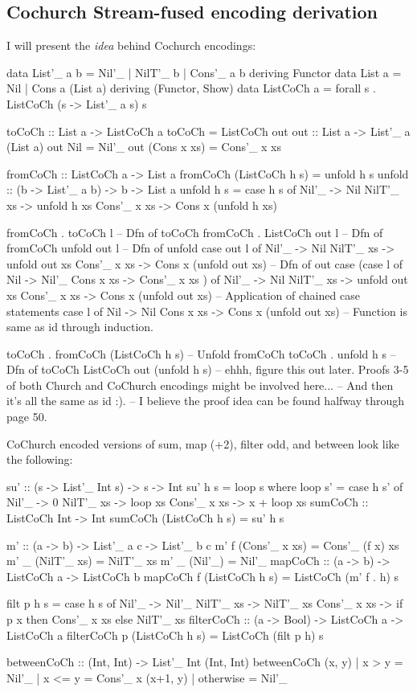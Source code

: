 
\subsection{Cochurch Stream-fused encoding derivation}\label{app:cochurch_stream}
I will present the \textit{idea} behind Cochurch encodings:
\begin{spec}
data List'_ a b = Nil'_ | NilT'_ b | Cons'_ a b deriving Functor
data List a = Nil | Cons a (List a) deriving (Functor, Show)
data ListCoCh a = forall s . ListCoCh (s -> List'_ a s) s

toCoCh :: List a -> ListCoCh a
toCoCh = ListCoCh out
out :: List a -> List'_ a (List a)
out Nil = Nil'_
out (Cons x xs) = Cons'_ x xs

fromCoCh :: ListCoCh a -> List a
fromCoCh (ListCoCh h s) = unfold h s
unfold :: (b -> List'_ a b) -> b -> List a
unfold h s = case h s of
  Nil'_ -> Nil
  NilT'_ xs -> unfold h xs
  Cons'_ x xs -> Cons x (unfold h xs)


fromCoCh . toCoCh l
-- Dfn of toCoCh
fromCoCh . ListCoCh out l
-- Dfn of fromCoCh
unfold out l
-- Dfn of unfold
case out l of
  Nil'_ -> Nil
  NilT'_ xs -> unfold out xs
  Cons'_ x xs -> Cons x (unfold out xs)
-- Dfn of out
case (case l of
  Nil -> Nil'_
  Cons x xs -> Cons'_ x xs
  ) of
  Nil'_ -> Nil
  NilT'_ xs -> unfold out xs
  Cons'_ x xs -> Cons x (unfold out xs)
-- Application of chained case statements
case l of
  Nil -> Nil
  Cons x xs -> Cons x (unfold out xs)
-- Function is same as id through induction.


toCoCh . fromCoCh (ListCoCh h s)
-- Unfold fromCoCh
toCoCh . unfold h s
-- Dfn of toCoCh
ListCoCh out (unfold h s)
-- ehhh, figure this out later. Proofs 3-5 of both Church and CoChurch encodings might be involved here...
-- And then it's all the same as id :).
-- I believe the proof idea can be found halfway through page 50.
\end{spec}
CoChurch encoded versions of sum, map (+2), filter odd, and between look like the following:
\begin{spec}
su' :: (s -> List'_ Int s) -> s -> Int
su' h s = loop s
  where loop s' = case h s' of
    Nil'_ -> 0
    NilT'_ xs -> loop xs
    Cons'_ x xs -> x + loop xs
sumCoCh :: ListCoCh Int -> Int
sumCoCh (ListCoCh h s) = su' h s

m' :: (a -> b) -> List'_ a c -> List'_ b c
m' f (Cons'_ x xs) = Cons'_ (f x) xs
m' _ (NilT'_ xs) = NilT'_ xs
m' _ (Nil'_) = Nil'_
mapCoCh :: (a -> b) -> ListCoCh a -> ListCoCh b
mapCoCh f (ListCoCh h s) = ListCoCh (m' f . h) s

filt p h s = case h s of
               Nil'_ -> Nil'_
               NilT'_ xs -> NilT'_ xs
               Cons'_ x xs -> if p x then Cons'_ x xs else NilT'_ xs
filterCoCh :: (a -> Bool) -> ListCoCh a -> ListCoCh a
filterCoCh p (ListCoCh h s) = ListCoCh (filt p h) s

betweenCoCh :: (Int, Int) -> List'_ Int (Int, Int)
betweenCoCh (x, y)
  | x > y = Nil'_
  | x <= y = Cons'_ x (x+1, y)
  | otherwise = Nil'_
\end{spec}

